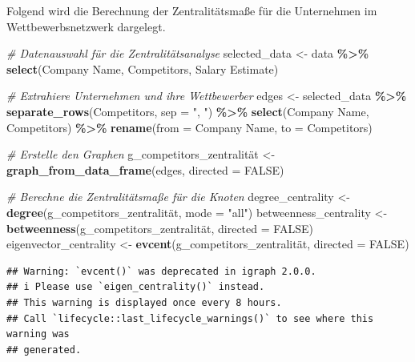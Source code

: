 \documentclass[
]{article}
\newenvironment{Shaded}{\begin{snugshade}}{\end{snugshade}}
\newcommand{\AttributeTok}[1]{\textcolor[rgb]{0.13,0.29,0.53}{#1}}
\newcommand{\CommentTok}[1]{\textcolor[rgb]{0.56,0.35,0.01}{\textit{#1}}}
\newcommand{\ConstantTok}[1]{\textcolor[rgb]{0.56,0.35,0.01}{#1}}
\newcommand{\FunctionTok}[1]{\textcolor[rgb]{0.13,0.29,0.53}{\textbf{#1}}}
\newcommand{\NormalTok}[1]{#1}
\newcommand{\OtherTok}[1]{\textcolor[rgb]{0.56,0.35,0.01}{#1}}
\newcommand{\SpecialCharTok}[1]{\textcolor[rgb]{0.81,0.36,0.00}{\textbf{#1}}}
\newcommand{\StringTok}[1]{\textcolor[rgb]{0.31,0.60,0.02}{#1}}
\begin{document}
Folgend wird die Berechnung der Zentralitätsmaße für die Unternehmen im
Wettbewerbsnetzwerk dargelegt.

\begin{Shaded}
\begin{Highlighting}[]
\CommentTok{\# Datenauswahl für die Zentralitätsanalyse}
\NormalTok{selected\_data }\OtherTok{\textless{}{-}}\NormalTok{ data }\SpecialCharTok{\%\textgreater{}\%}
  \FunctionTok{select}\NormalTok{(}\StringTok{\textasciigrave{}}\AttributeTok{Company Name}\StringTok{\textasciigrave{}}\NormalTok{, Competitors, }\StringTok{\textasciigrave{}}\AttributeTok{Salary Estimate}\StringTok{\textasciigrave{}}\NormalTok{)}

\CommentTok{\# Extrahiere Unternehmen und ihre Wettbewerber}
\NormalTok{edges }\OtherTok{\textless{}{-}}\NormalTok{ selected\_data }\SpecialCharTok{\%\textgreater{}\%}
  \FunctionTok{separate\_rows}\NormalTok{(Competitors, }\AttributeTok{sep =} \StringTok{", "}\NormalTok{) }\SpecialCharTok{\%\textgreater{}\%}
  \FunctionTok{select}\NormalTok{(}\StringTok{\textasciigrave{}}\AttributeTok{Company Name}\StringTok{\textasciigrave{}}\NormalTok{, Competitors) }\SpecialCharTok{\%\textgreater{}\%}
  \FunctionTok{rename}\NormalTok{(}\AttributeTok{from =} \StringTok{\textasciigrave{}}\AttributeTok{Company Name}\StringTok{\textasciigrave{}}\NormalTok{, }\AttributeTok{to =}\NormalTok{ Competitors)}

\CommentTok{\# Erstelle den Graphen}
\NormalTok{g\_competitors\_zentralität }\OtherTok{\textless{}{-}} \FunctionTok{graph\_from\_data\_frame}\NormalTok{(edges, }\AttributeTok{directed =} \ConstantTok{FALSE}\NormalTok{)}


\CommentTok{\# Berechne die Zentralitätsmaße für die Knoten}
\NormalTok{degree\_centrality }\OtherTok{\textless{}{-}} \FunctionTok{degree}\NormalTok{(g\_competitors\_zentralität, }\AttributeTok{mode =} \StringTok{"all"}\NormalTok{)}
\NormalTok{betweenness\_centrality }\OtherTok{\textless{}{-}} \FunctionTok{betweenness}\NormalTok{(g\_competitors\_zentralität, }\AttributeTok{directed =} \ConstantTok{FALSE}\NormalTok{)}
\NormalTok{eigenvector\_centrality }\OtherTok{\textless{}{-}} \FunctionTok{evcent}\NormalTok{(g\_competitors\_zentralität, }\AttributeTok{directed =} \ConstantTok{FALSE}\NormalTok{)}
\end{Highlighting}
\end{Shaded}

\begin{verbatim}
## Warning: `evcent()` was deprecated in igraph 2.0.0.
## i Please use `eigen_centrality()` instead.
## This warning is displayed once every 8 hours.
## Call `lifecycle::last_lifecycle_warnings()` to see where this warning was
## generated.
\end{verbatim}
\end{document}
